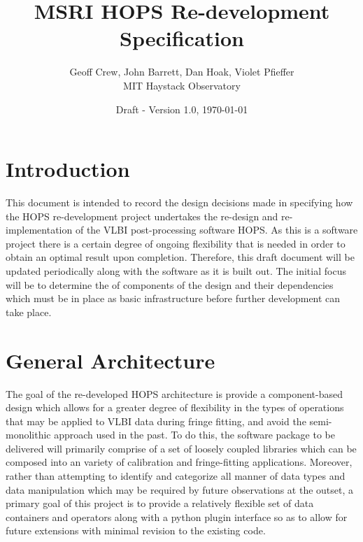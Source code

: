 \documentclass[hidelinks]{article}
\title{ \textbf{MSRI HOPS Re-development Specification} }
\author{
\large Geoff Crew, John Barrett, Dan Hoak, Violet Pfieffer \\
\Large MIT Haystack Observatory}
\date{Draft - Version 1.0, \today}
\let\Oldsection\section
\renewcommand{\section}{\FloatBarrier\Oldsection}
\begin{document}
\maketitle


\tiny
\tableofcontents
\normalsize
\newpage

\section{Introduction}

This document is intended to record the design decisions made in specifying how the HOPS re-development project undertakes the
re-design and re-implementation of the VLBI post-processing software HOPS. As this is a software project there is a certain
degree of ongoing flexibility that is needed in order to obtain an optimal result upon completion. Therefore, this 
draft document will be updated periodically along with the software as it is built out. The initial focus will be to determine
the of components of the design and their dependencies which must be in place as basic infrastructure before further development
can take place.


\section{General Architecture}

The goal of the re-developed HOPS architecture is provide a component-based design which allows for a greater degree of flexibility
in the types of operations that may be applied to VLBI data during fringe fitting, and avoid the semi-monolithic approach used in the past.
To do this, the software package to be delivered will primarily comprise of a set of loosely coupled libraries which can be composed
into an variety of calibration and fringe-fitting applications. Moreover, rather than attempting to identify and categorize all manner of data
types and data manipulation which may be required by future observations at the outset, a primary goal of this project is to provide a
relatively flexible set of data containers and operators along with a python plugin interface so as to allow for future extensions with minimal revision to the existing code.
\end{document}
